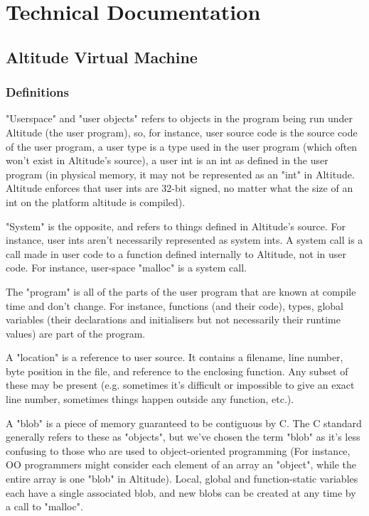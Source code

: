 \documentclass[10pt,a4paper]{report}
\begin{document}
\chapter{Technical Documentation}
\section{Altitude Virtual Machine}

\subsection{Definitions}
"Userspace" and "user objects" refers to objects in the program being run under Altitude (the user program), so, for instance, user source code is the source code of the user program, a user type is a type used in the user program (which often won't exist in Altitude's source), a user int is an int as defined in the user program (in physical memory, it may not be represented as an "int" in Altitude. Altitude enforces that user ints are 32-bit signed, no matter what the size of an int on the platform altitude is compiled).

"System" is the opposite, and refers to things defined in Altitude's source. For instance, user ints aren't necessarily represented as system ints. A system call is a call made in user code to a function defined internally to Altitude, not in user code. For instance, user-space "malloc" is a system call.

The "program" is all of the parts of the user program that are known at compile time and don't change. For instance, functions (and their code), types, global variables (their declarations and initialisers but not necessarily their runtime values) are part of the program.

A "location" is a reference to user source. It contains a filename, line number, byte position in the file, and reference to the enclosing function. Any subset of these may be present (e.g. sometimes it's difficult or impossible to give an exact line number, sometimes things happen outside any function, etc.).

A "blob" is a piece of memory guaranteed to be contiguous by C. The C standard generally refers to these as "objects", but we've chosen the term "blob" as it's less confusing to those who are used to object-oriented programming (For instance, OO programmers might consider each element of an array an "object", while the entire array is one "blob" in Altitude). Local, global and function-static variables each have a single associated blob, and new blobs can be created at any time by a call to "malloc".
\end{document}
